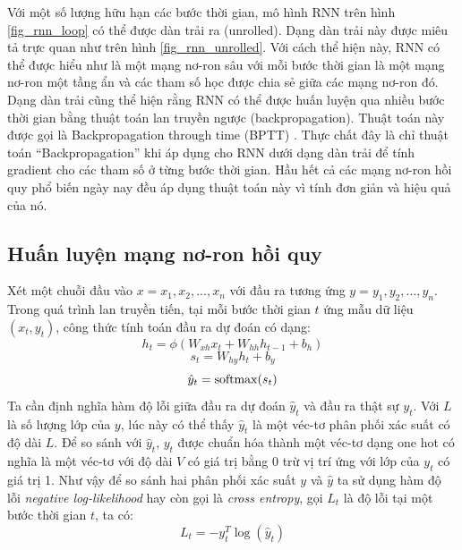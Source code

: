 Với một số lượng hữu hạn các bước thời gian, mô hình RNN trên hình \ref{fig_rnn_loop} có thể được dàn trải ra (unrolled). Dạng dàn trải này được miêu tả trực quan như trên hình \ref{fig_rnn_unrolled}. Với cách thể hiện này, RNN có thể được hiểu như là một mạng nơ-ron sâu với mỗi bước thời gian là một mạng nơ-ron một tầng ẩn và các tham số học được chia sẻ giữa các mạng nơ-ron đó. Dạng dàn trải cũng thể hiện rằng RNN có thể được huấn luyện qua nhiều bước thời gian bằng thuật toán lan truyền ngược (backpropagation). Thuật toán này được gọi là Backpropagation through time (BPTT) \cite{werbos1990}. Thực chất đây là chỉ thuật toán “Backpropagation” khi áp dụng cho RNN dưới dạng dàn trải để tính gradient cho các tham số ở từng bước thời gian. Hầu hết cả các mạng nơ-ron hồi quy phổ biến ngày nay đều áp dụng thuật toán này vì tính đơn giản và hiệu quả của nó.

\subsection{Huấn luyện mạng nơ-ron hồi quy}

Xét một chuỗi đầu vào $x={x_1,x_2,...,x_n}$ với đầu ra tương ứng $y={y_1,y_2,...,y_n}$. Trong quá trình lan truyền tiến, tại mỗi bước thời gian $t$ ứng mẫu dữ liệu $(x_t, y_t)$, công thức tính toán đầu ra dự đoán có dạng:
\begin{equation} \label{rnnForwardProp1}
	h_t = \phi \left(W_{xh} x_t + W_{hh}h_{t-1} + b_h \right) 
\end{equation}
\begin{equation} \label{rnnForwardProp2}
	s_t = W_{hy} h_t + b_y 
\end{equation}
\begin{equation} \label{rnnForwardProp3}
	\hat{y}_t = \mathrm{softmax} (s_t) 
\end{equation}
Ta cần định nghĩa hàm độ lỗi giữa đầu ra dự đoán $\hat{y}_t$ và đầu ra thật sự $y_t$. Với $L$ là số lượng lớp của $y$, lúc này có thể thấy $\hat{y}_t$ là một véc-tơ phân phối xác suất có độ dài $L$. Để so sánh với $\hat{y}_t$, $y_t$ được chuẩn hóa thành một véc-tơ dạng one hot có nghĩa là một véc-tơ với độ dài $V$ có giá trị bằng 0 trừ vị trí ứng với lớp của $y_t$ có giá trị 1. Như vậy để so sánh hai phân phối xác suất $y$ và $\hat{y}$ ta sử dụng hàm độ lỗi \textit{negative log-likelihood} hay còn gọi là \textit{cross entropy}, gọi $L_t$ là độ lỗi tại một bước thời gian $t$, ta có:
\begin{equation} \label{errorOfAnExample}
	L_t = -y_t^{T} \log(\hat{y}_t)
\end{equation}

